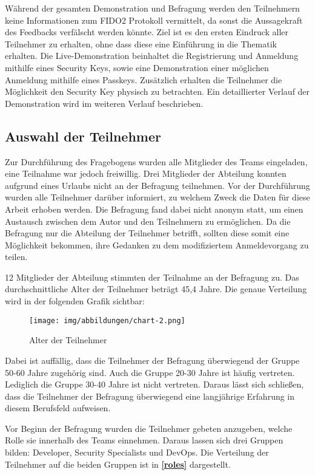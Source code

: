 Während der gesamten Demonstration und Befragung werden den Teilnehmern keine Informationen zum FIDO2 Protokoll vermittelt, da sonst die Aussagekraft des Feedbacks verfälscht werden könnte. Ziel ist es den ersten Eindruck aller Teilnehmer zu erhalten, ohne dass diese eine Einführung in die Thematik erhalten. Die Live-Demonstration beinhaltet die Registrierung und Anmeldung mithilfe eines Security Keys, sowie eine Demonstration einer möglichen Anmeldung mithilfe eines Passkeys. Zusätzlich erhalten die Teilnehmer die Möglichkeit den Security Key physisch zu betrachten. Ein detaillierter Verlauf der Demonstration wird im weiteren Verlauf beschrieben.

\subsection{Auswahl der Teilnehmer}
Zur Durchführung des Fragebogens wurden alle Mitglieder des Teams eingeladen, eine Teilnahme war jedoch freiwillig. Drei Mitglieder der Abteilung konnten aufgrund eines Urlaubs nicht an der Befragung teilnehmen. Vor der Durchführung wurden alle Teilnehmer darüber informiert, zu welchem Zweck die Daten für diese Arbeit erhoben werden. Die Befragung fand dabei nicht anonym statt, um einen Austausch zwischen dem Autor und den Teilnehmern zu ermöglichen. Da die Befragung nur die Abteilung der Teilnehmer betrifft, sollten diese somit eine Möglichkeit bekommen, ihre Gedanken zu dem modifiziertem Anmeldevorgang zu teilen.

12 Mitglieder der Abteilung stimmten der Teilnahme an der Befragung zu. Das durchschnittliche Alter der Teilnehmer beträgt 45,4 Jahre. Die genaue Verteilung wird in der folgenden Grafik sichtbar:

\begin{figure}[H]
	\centering 
	\texttt{[image: img/abbildungen/chart-2.png]}
	\captionsetup{format=hang}
	\caption{Alter der Teilnehmer}
\end{figure}

Dabei ist auffällig, dass die Teilnehmer der Befragung überwiegend der Gruppe 50-60 Jahre zugehörig sind. Auch die Gruppe 20-30 Jahre ist häufig vertreten. Lediglich die Gruppe 30-40 Jahre ist nicht vertreten. Daraus lässt sich schließen, dass die Teilnehmer der Befragung überwiegend eine langjährige Erfahrung in diesem Berufsfeld aufweisen. 

Vor Beginn der Befragung wurden die Teilnehmer gebeten anzugeben, welche Rolle sie innerhalb des Teams einnehmen. Daraus lassen sich drei Gruppen bilden: Developer, Security Specialists und DevOps. Die Verteilung der Teilnehmer auf die beiden Gruppen ist in \textbf{\ref{roles}} dargestellt.

